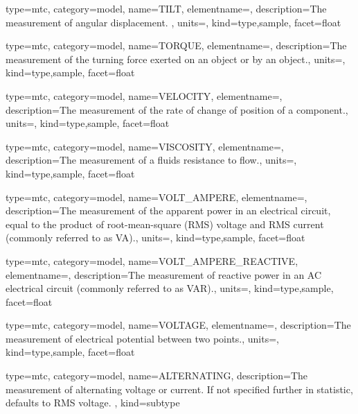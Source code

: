 {
  type=mtc,
  category=model,
  name={TILT},
  elementname=,
  description={The measurement of angular displacement. },
  units=,
  kind={type,sample},
  facet={\gls{float}}
}


{
  type=mtc,
  category=model,
  name={TORQUE},
  elementname=,
  description={The measurement of the turning force exerted on an object or by an object.},
  units=,
  kind={type,sample},
  facet={\gls{float}}
}


{
  type=mtc,
  category=model,
  name={VELOCITY},
  elementname=,
  description={The measurement of the rate of change of position of a \gls{component}.},
  units=,
  kind={type,sample},
  facet={\gls{float}}
}


{
  type=mtc,
  category=model,
  name={VISCOSITY},
  elementname=,
  description={The measurement of a fluids resistance to flow.},
  units=,
  kind={type,sample},
  facet={\gls{float}}
}


{
  type=mtc,
  category=model,
  name={VOLT\_AMPERE},
  elementname=,
  description={The measurement of the apparent power in an electrical circuit, equal to the product of root-mean-square (RMS) voltage and RMS current (commonly referred to as VA).},
  units=,
  kind={type,sample},
  facet={\gls{float}}
}


{
  type=mtc,
  category=model,
  name={VOLT\_AMPERE\_REACTIVE},
  elementname=,
  description={The measurement of reactive power in an AC electrical circuit (commonly referred to as VAR).},
  units=,
  kind={type,sample},
  facet={\gls{float}}
}


{
  type=mtc,
  category=model,
  name={VOLTAGE},
  elementname=,
  description={The measurement of electrical potential between two points.},
  units=,
  kind={type,sample},
  facet={\gls{float}}
}


{
  type=mtc,
  category=model,
  name={ALTERNATING},
  description={The measurement of alternating voltage or current.   If not specified further in statistic, defaults to RMS voltage. },
  kind={subtype}
}



